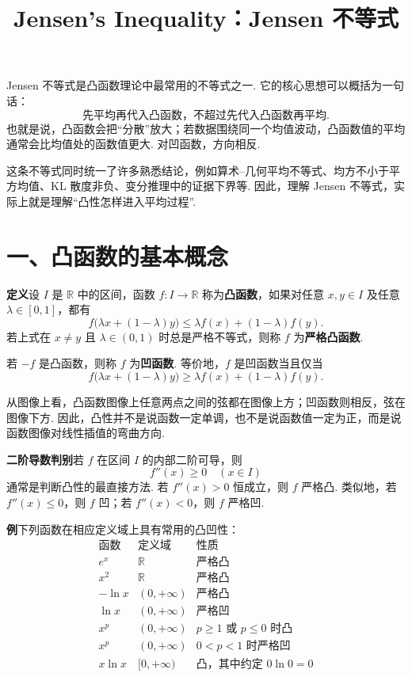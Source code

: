 \documentclass[UTF8, 12pt, fontset=fandol, oneside]{ctexart}
\title{Jensen's Inequality：Jensen 不等式}
\author{}
\date{}
\begin{document}
\maketitle

Jensen 不等式是凸函数理论中最常用的不等式之一. 它的核心思想可以概括为一句话：
\[
  \text{先平均再代入凸函数，不超过先代入凸函数再平均.}
\]
也就是说，凸函数会把``分散''放大；若数据围绕同一个均值波动，凸函数值的平均通常会比均值处的函数值更大. 对凹函数，方向相反.

这条不等式同时统一了许多熟悉结论，例如算术--几何平均不等式、均方不小于平方均值、KL 散度非负、变分推理中的证据下界等. 因此，理解 Jensen 不等式，实际上就是理解``凸性怎样进入平均过程''.

\section*{一、凸函数的基本概念}

\noindent\textbf{定义}\quad 设 $I$ 是 $\mathbb R$ 中的区间，函数 $f:I\to\mathbb R$ 称为\textbf{凸函数}，如果对任意 $x,y\in I$ 及任意 $\lambda\in[0,1]$，都有
\[
  f\bigl(\lambda x+(1-\lambda)y\bigr)
  \le
  \lambda f(x)+(1-\lambda)f(y).
\]
若上式在 $x\ne y$ 且 $\lambda\in(0,1)$ 时总是严格不等式，则称 $f$ 为\textbf{严格凸函数}.

若 $-f$ 是凸函数，则称 $f$ 为\textbf{凹函数}. 等价地，$f$ 是凹函数当且仅当
\[
  f\bigl(\lambda x+(1-\lambda)y\bigr)
  \ge
  \lambda f(x)+(1-\lambda)f(y).
\]

从图像上看，凸函数图像上任意两点之间的弦都在图像上方；凹函数则相反，弦在图像下方. 因此，凸性并不是说函数一定单调，也不是说函数值一定为正，而是说函数图像对线性插值的弯曲方向.

\noindent\textbf{二阶导数判别}\quad 若 $f$ 在区间 $I$ 的内部二阶可导，则
\[
  f''(x)\ge0\quad(x\in I)
\]
通常是判断凸性的最直接方法. 若 $f''(x)>0$ 恒成立，则 $f$ 严格凸. 类似地，若 $f''(x)\le0$，则 $f$ 凹；若 $f''(x)<0$，则 $f$ 严格凹.

\noindent\textbf{例}\quad 下列函数在相应定义域上具有常用的凸凹性：
\[
\begin{array}{c|c|c}
  \text{函数} & \text{定义域} & \text{性质}\\ \hline
  e^x & \mathbb R & \text{严格凸}\\
  x^2 & \mathbb R & \text{严格凸}\\
  -\ln x & (0,+\infty) & \text{严格凸}\\
  \ln x & (0,+\infty) & \text{严格凹}\\
  x^p & (0,+\infty) & p\ge1\text{ 或 }p\le0\text{ 时凸}\\
  x^p & (0,+\infty) & 0<p<1\text{ 时严格凹}\\
  x\ln x & [0,+\infty) & \text{凸，其中约定 }0\ln0=0
\end{array}
\]
\end{document}
